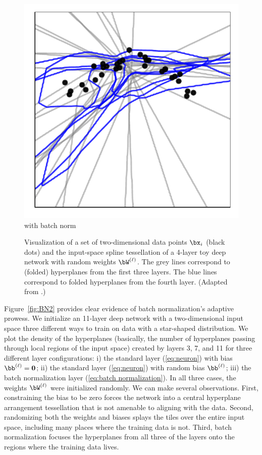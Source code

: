\documentclass{notices}
\begin{document}
\begin{figure}[h]
\begin{minipage}{0.49\linewidth}
\includegraphics[width=\linewidth]{Figs/2d_partition_after_3_2.pdf} \\[0em]
{\small\sf with batch norm}
\end{minipage}
    \caption{\small
    Visualization of a set of two-dimensional data points $\bx_i$ (black dots) and the input-space spline tessellation of a 4-layer toy deep network with 
    random weights $\bW^{(\ell)}$.
    The grey lines correspond to (folded) hyperplanes from the first three layers.
    The blue lines correspond to folded hyperplanes from the fourth layer. 
    (Adapted from \cite{BN-arxiv}.)
}
    \label{fig:BN1}
\end{figure}


Figure~\ref{fig:BN2} provides clear evidence of batch normalization's adaptive prowess. 
We initialize an 11-layer deep network with a two-dimensional input space three different ways to train on data with a star-shaped distribution.
We plot the density of the hyperplanes (basically, the number of hyperplanes passing through local regions of the input space) created by layers 3, 7, and 11 for three different layer configurations:
i) the standard layer (\ref{eq:neuron}) with bias $\bb^{(\ell)}={\bf 0}$; 
ii) the standard layer (\ref{eq:neuron}) with random bias $\bb^{(\ell)}$;
iii) the batch normalization layer (\ref{eq:batch normalization}).
In all three cases, the weights $\bW^{(\ell)}$ were initialized randomly.
We can make several observations.
First, constraining the bias to be zero forces the network into a central hyperplane arrangement tessellation that is not amenable to aligning with the data.
Second, randomizing both the weights and biases splays the tiles over the entire input space, including many places where the training data is not.
Third, batch normalization focuses the hyperplanes from all three of the layers onto the regions where the training data lives.
\end{document}
